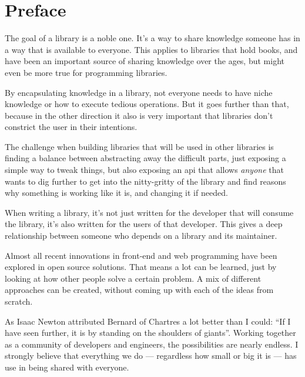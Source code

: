 
\chapter{Preface}%
\label{chp:preface}

The goal of a \gls{library} is a noble one. It's a way to share knowledge someone has in a way that is available to everyone. This applies to libraries that hold books, and have been an important source of sharing knowledge over the ages, but might even be more true for programming libraries. 

By encapsulating knowledge in a \gls{library}, not everyone needs to have niche knowledge or how to execute tedious operations. But it goes further than that, because in the other direction it also is very important that libraries don't constrict the user in their intentions.

The challenge when building libraries that will be used in other libraries is finding a balance between abstracting away the difficult parts, just exposing a simple way to tweak things, but also exposing an \acrfull{api} that allows \emph{anyone} that wants to dig further to get into the nitty-gritty of the \gls{library} and find reasons why something is working like it is, and changing it if needed.

When writing a \gls{library}, it's not just written for the developer that will consume the library, it's also written for the users of that developer. This gives a deep relationship between someone who depends on a \gls{library} and its maintainer.

Almost all recent innovations in front-end and web programming have been explored in open source solutions. That means a lot can be learned, just by looking at how other people solve a certain problem. A mix of different approaches can be created, without coming up with each of the ideas from scratch. 

As Isaac Newton\cite{newton-giants} attributed Bernard of Chartres\cite{quote-giants-source} a lot better than I could: ``If I have seen further, it is by standing on the shoulders of giants''. Working together as a community of developers and engineers, the possibilities are nearly endless. I strongly believe that everything we do --- regardless how small or big it is --- has use in being shared with everyone.
